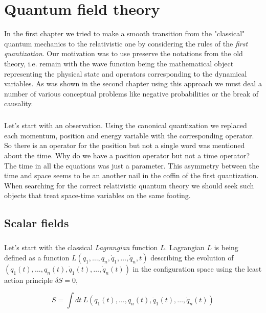 \chapter{Quantum field theory}

In the first chapter we tried to make a smooth transition from the "classical" quantum mechanics
to the relativistic one by considering the rules of the \textit{first quantization}. Our motivation
was to use preserve the notations from the old theory, i.e. remain with the wave function being the
mathematical object representing the physical state and operators corresponding to the dynamical 
variables. As was shown in the second chapter using this approach we must deal a number of
various conceptual problems like negative probabilities or the break of causality. 

\paragraph{} Let's start with an observation. Using the canonical quantization we replaced each momentum, position
and energy variable with the corresponding operator. So there is an operator for the position
but not a single word was mentioned about the time. Why do we have a position operator but not a
time operator? The time in all the equations was just a parameter. This asymmetry between the time
and space seems to be an another nail in the coffin of the first quantization. When searching for
the correct relativistic quantum theory we should seek such objects that treat space-time variables
on the same footing. 

\section{Scalar fields}

\paragraph{} Let's start with the classical \textit{Lagrangian} function $L$. Lagrangian $L$ is being defined as a 
function $L(q_{1}, \dots, q_{n}, \dot{q}_{1}, \dots, \dot{q}_{n}, t)$ describing the evolution of 
$(q_{1}(t), \dots, q_{n}(t), \dot{q}_{1}(t), \dots, \dot{q}_{n}(t))$ in the configuration space using the least action 
principle $\delta S = 0$,

\begin{equation}
    \label{eq:action}
    S = \int dt \ L(q_{1}(t), \dots, q_{n}(t), \dot{q}_{1}(t), \dots, \dot{q}_{n}(t))
\end{equation}

